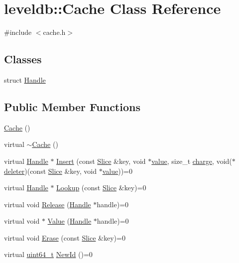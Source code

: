\hypertarget{classleveldb_1_1_cache}{}\section{leveldb\+:\+:Cache Class Reference}
\label{classleveldb_1_1_cache}


{\ttfamily \#include $<$cache.\+h$>$}

\subsection*{Classes}
\begin{DoxyCompactItemize}
\item 
struct \hyperlink{structleveldb_1_1_cache_1_1_handle}{Handle}
\end{DoxyCompactItemize}
\subsection*{Public Member Functions}
\begin{DoxyCompactItemize}
\item 
\hyperlink{classleveldb_1_1_cache_ac9b129b21ba8eda181645fc3f6a8dfe6}{Cache} ()
\item 
virtual \hyperlink{classleveldb_1_1_cache_a1369f94b24a31099443f714b8b8ab527}{$\sim$\+Cache} ()
\item 
virtual \hyperlink{structleveldb_1_1_cache_1_1_handle}{Handle} $\ast$ \hyperlink{classleveldb_1_1_cache_af0b55b7fa0e64184fa62e0dbe9ba9eae}{Insert} (const \hyperlink{classleveldb_1_1_slice}{Slice} \&key, void $\ast$\hyperlink{cache_8cc_a0f61d63b009d0880a89c843bd50d8d76}{value}, size\+\_\+t \hyperlink{cache_8cc_a7476acc4f60747f9d9032e9cbdf5eb79}{charge}, void($\ast$\hyperlink{cache_8cc_accd93a4ec30e3a96658ecae0c6a724fe}{deleter})(const \hyperlink{classleveldb_1_1_slice}{Slice} \&key, void $\ast$\hyperlink{cache_8cc_a0f61d63b009d0880a89c843bd50d8d76}{value}))=0
\item 
virtual \hyperlink{structleveldb_1_1_cache_1_1_handle}{Handle} $\ast$ \hyperlink{classleveldb_1_1_cache_af90785205182a25cf741dc13a48d76cb}{Lookup} (const \hyperlink{classleveldb_1_1_slice}{Slice} \&key)=0
\item 
virtual void \hyperlink{classleveldb_1_1_cache_a712618c8bf3bfa48b7bab1fbc23c3002}{Release} (\hyperlink{structleveldb_1_1_cache_1_1_handle}{Handle} $\ast$handle)=0
\item 
virtual void $\ast$ \hyperlink{classleveldb_1_1_cache_a454920df8e68917adcf011dfb3538661}{Value} (\hyperlink{structleveldb_1_1_cache_1_1_handle}{Handle} $\ast$handle)=0
\item 
virtual void \hyperlink{classleveldb_1_1_cache_af833a38763598253338de37aba079db6}{Erase} (const \hyperlink{classleveldb_1_1_slice}{Slice} \&key)=0
\item 
virtual \hyperlink{stdint_8h_aaa5d1cd013383c889537491c3cfd9aad}{uint64\+\_\+t} \hyperlink{classleveldb_1_1_cache_ae2d79bfe747fc6c165c77398cc31e125}{New\+Id} ()=0
\end{DoxyCompactItemize}


